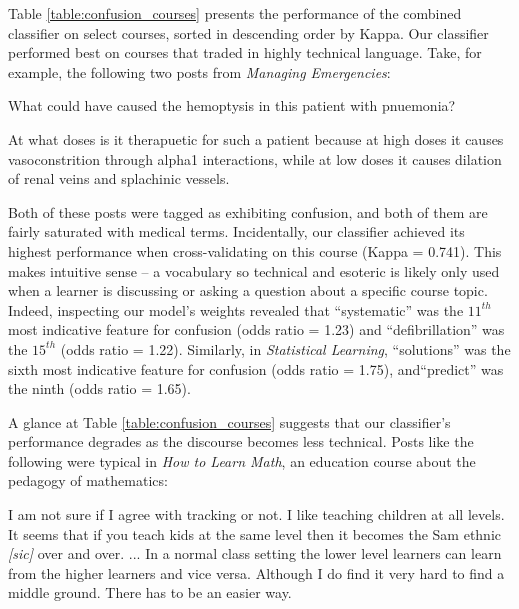 \documentclass{edm_template}
\begin{document}
Table \ref{table:confusion_courses} presents the performance of the combined classifier on select courses, sorted in descending order by Kappa. Our classifier performed best on courses that traded in highly technical language. Take, for example, the following two posts from \emph{Managing Emergencies}:

\vspace{-10pt}
\begin{displayquote}
What could have caused the hemoptysis in this patient with pnuemonia?
\end{displayquote}
\vspace{-10pt}

\vspace{-5pt}
\begin{displayquote}
At what doses is it therapuetic for such a patient because at high doses it causes vasoconstrition through alpha1 interactions, while at low doses it causes dilation of renal veins and splachinic vessels.
\end{displayquote}
\vspace{-10pt}

Both of these posts were tagged as exhibiting confusion, and both of them are fairly saturated with medical terms. Incidentally, our classifier achieved its highest performance when cross-validating on this course (Kappa = 0.741). This makes intuitive sense -- a vocabulary so technical and esoteric is likely only used when a learner is discussing or asking a question about a specific course topic. Indeed, inspecting our model's weights revealed that ``systematic'' was the $11^{th}$ most indicative feature for confusion (odds ratio = 1.23) and ``defibrillation'' was the $15^{th}$ (odds ratio = 1.22). Similarly, in \emph{Statistical Learning}, ``solutions'' was the sixth most indicative feature for confusion (odds ratio = 1.75), and``predict'' was the ninth (odds ratio = 1.65).

A glance at Table \ref{table:confusion_courses} suggests that our classifier's performance degrades as the discourse becomes less technical. Posts like the following were typical in \emph{How to Learn Math}, an education course about the pedagogy of mathematics:

\vspace{-10pt}
\begin{displayquote}
I am not sure if I agree with tracking or not.  I like teaching children at all levels.  It seems that if you teach kids at the same level then it becomes the Sam ethnic \emph{[sic]} over and over.  ...  In a normal class setting the lower level learners can learn from the higher learners and vice versa.  Although I do find it very hard to find a middle ground. There has to be an easier way.
\vspace{-10pt}
\end{displayquote}
\end{document}
